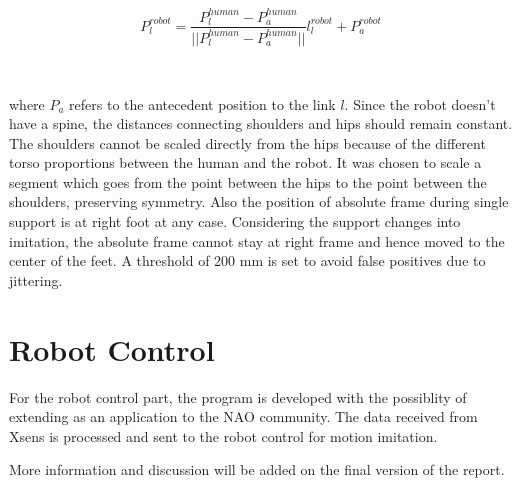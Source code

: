\begin{equation}
    P_l^{robot} = \frac{P_l^{human} - P_a^{human}}{||P_l^{human} - P_a^{human}||}l_l^{robot} + P_a^{robot}
\end{equation}

~

where $P_a$ refers to the antecedent position to the link $l$. Since the robot doesn’t have a spine, the distances connecting shoulders and hips 
should remain constant. The shoulders cannot be scaled directly from the hips because of the different torso proportions between the human and the 
robot. It was chosen to scale a segment which goes from the point between the hips to the point between the shoulders, preserving symmetry. Also the 
position of absolute frame during single support is at right foot at any case. Considering the support changes into imitation, the absolute frame 
cannot stay at right frame and hence moved to the center of the feet. A threshold of 200 mm is set to avoid false positives due to jittering.

\section{Robot Control}

For the robot control part, the program is developed with the possiblity of extending as an application to the NAO community. The data received from 
Xsens is processed and sent to the robot control for motion imitation. 


More information and discussion will be added on the final version of the report.
